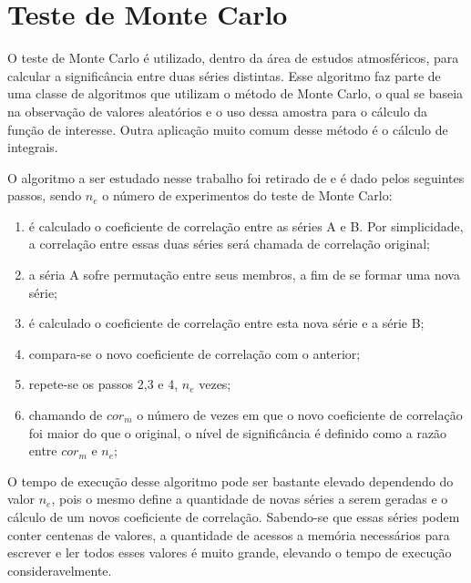 \section{Teste de Monte Carlo}

O teste de Monte Carlo é utilizado, dentro da área de estudos atmosféricos, para calcular a significância entre duas séries distintas. Esse algoritmo faz parte de uma classe de algoritmos que utilizam o método de Monte Carlo, o qual se baseia na observação de valores aleatórios e o uso dessa amostra para o cálculo da função de interesse. Outra aplicação muito comum desse método é o cálculo de integrais.

O algoritmo a ser estudado nesse trabalho foi retirado de \cite{Joao:2010} e é dado pelos seguintes passos, sendo $n_{e}$ o número de experimentos do teste de Monte Carlo:

\begin{enumerate}
\item  é calculado o coeficiente de correlação entre as séries A e B. Por simplicidade, a correlação entre essas duas séries será chamada de correlação original;

\item  a séria A sofre permutação entre seus membros, a fim de se formar uma nova série;

\item  é calculado o coeficiente de correlação entre esta nova série e a série B;

\item  compara-se o novo coeficiente de correlação com o anterior;

\item  repete-se os passos 2,3 e 4, $n_{e}$ vezes;

\item  chamando de $cor_{m}$ o número de vezes em que o novo coeficiente de correlação foi maior do que o original, o nível de significância é definido como a razão entre $cor_{m}$ e $n_{e}$;
\end{enumerate}

O tempo de execução desse algoritmo pode ser bastante elevado dependendo do valor $n_{e}$, pois o mesmo define a quantidade de novas séries a serem geradas e o cálculo de um novos coeficiente de correlação. Sabendo-se que essas séries podem conter centenas de valores, a quantidade de acessos a memória necessários para escrever e ler todos esses valores é muito grande, elevando o tempo de execução consideravelmente.